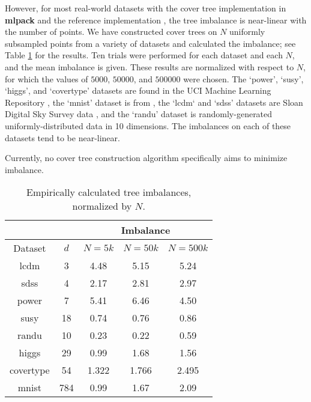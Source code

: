 However, for most real-world datasets with the cover tree implementation in {\bf
mlpack} \citep{mlpack2013} and the reference implementation
\citep{langford2006}, the tree imbalance is near-linear with the number of
points.  We have constructed cover trees on $N$ uniformly subsampled points
from a variety of datasets and calculated the imbalance; see Table
\ref{tab:imbalance} for the results.  Ten trials were performed for each dataset
and each $N$, and the mean imbalance is given.  These results are normalized
with respect to $N$, for which the values of $5000$, $50000$, and $500000$ were
chosen.  The `power', `susy', `higgs', and `covertype' datasets are found in the
UCI Machine Learning Repository \citep{ucimlrepository}, the `mnist' dataset is
from \cite{lecun2000mnist}, the `lcdm` and `sdss' datasets are Sloan Digital Sky
Survey data \citep{adelman2008sixth}, and the `randu' dataset is
randomly-generated uniformly-distributed data in 10 dimensions.  The imbalances
on each of these datasets tend to be near-linear.

Currently, no cover tree construction algorithm specifically aims to minimize
imbalance.

\begin{table}[tb]
\begin{center}
\begin{tabular}{| c | c | c | c | c |}
\hline
 & & \multicolumn{3}{|c|}{Imbalance} \\
\hline
Dataset & $d$ & $N = 5k$ & $N = 50k$ & $N = 500k$ \\
\hline
lcdm & 3 & 4.48 & 5.15 & 5.24 \\
sdss & 4 & 2.17 & 2.81 & 2.97 \\
power & 7 & 5.41 & 6.46 & 4.50 \\
susy & 18 & 0.74 & 0.76 & 0.86 \\
randu & 10 & 0.23 & 0.22 & 0.59 \\
higgs & 29 & 0.99 & 1.68 & 1.56 \\
covertype & 54 & 1.322 & 1.766 & 2.495 \\
mnist & 784 & 0.99 & 1.67 & 2.09 \\
\hline
\end{tabular}
\end{center}
\caption{Empirically calculated tree imbalances, normalized by $N$.}
\label{tab:imbalance}
\end{table}


